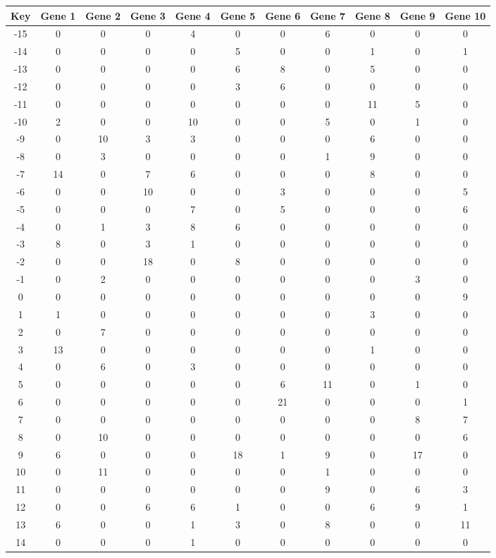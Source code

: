 \begin{tabular}{|c|c|c|c|c|c|c|c|c|c|c|}
\hline
Key & Gene 1 & Gene 2 & Gene 3 & Gene 4 & Gene 5 & Gene 6 & Gene 7 & Gene 8 & Gene 9 & Gene 10 \\
\hline
-15 & 0 & 0 & 0 & 4 & 0 & 0 & 6 & 0 & 0 & 0 \\
-14 & 0 & 0 & 0 & 0 & 5 & 0 & 0 & 1 & 0 & 1 \\
-13 & 0 & 0 & 0 & 0 & 6 & 8 & 0 & 5 & 0 & 0 \\
-12 & 0 & 0 & 0 & 0 & 3 & 6 & 0 & 0 & 0 & 0 \\
-11 & 0 & 0 & 0 & 0 & 0 & 0 & 0 & 11 & 5 & 0 \\
-10 & 2 & 0 & 0 & 10 & 0 & 0 & 5 & 0 & 1 & 0 \\
-9 & 0 & 10 & 3 & 3 & 0 & 0 & 0 & 6 & 0 & 0 \\
-8 & 0 & 3 & 0 & 0 & 0 & 0 & 1 & 9 & 0 & 0 \\
-7 & 14 & 0 & 7 & 6 & 0 & 0 & 0 & 8 & 0 & 0 \\
-6 & 0 & 0 & 10 & 0 & 0 & 3 & 0 & 0 & 0 & 5 \\
-5 & 0 & 0 & 0 & 7 & 0 & 5 & 0 & 0 & 0 & 6 \\
-4 & 0 & 1 & 3 & 8 & 6 & 0 & 0 & 0 & 0 & 0 \\
-3 & 8 & 0 & 3 & 1 & 0 & 0 & 0 & 0 & 0 & 0 \\
-2 & 0 & 0 & 18 & 0 & 8 & 0 & 0 & 0 & 0 & 0 \\
-1 & 0 & 2 & 0 & 0 & 0 & 0 & 0 & 0 & 3 & 0 \\
0 & 0 & 0 & 0 & 0 & 0 & 0 & 0 & 0 & 0 & 9 \\
1 & 1 & 0 & 0 & 0 & 0 & 0 & 0 & 3 & 0 & 0 \\
2 & 0 & 7 & 0 & 0 & 0 & 0 & 0 & 0 & 0 & 0 \\
3 & 13 & 0 & 0 & 0 & 0 & 0 & 0 & 1 & 0 & 0 \\
4 & 0 & 6 & 0 & 3 & 0 & 0 & 0 & 0 & 0 & 0 \\
5 & 0 & 0 & 0 & 0 & 0 & 6 & 11 & 0 & 1 & 0 \\
6 & 0 & 0 & 0 & 0 & 0 & 21 & 0 & 0 & 0 & 1 \\
7 & 0 & 0 & 0 & 0 & 0 & 0 & 0 & 0 & 8 & 7 \\
8 & 0 & 10 & 0 & 0 & 0 & 0 & 0 & 0 & 0 & 6 \\
9 & 6 & 0 & 0 & 0 & 18 & 1 & 9 & 0 & 17 & 0 \\
10 & 0 & 11 & 0 & 0 & 0 & 0 & 1 & 0 & 0 & 0 \\
11 & 0 & 0 & 0 & 0 & 0 & 0 & 9 & 0 & 6 & 3 \\
12 & 0 & 0 & 6 & 6 & 1 & 0 & 0 & 6 & 9 & 1 \\
13 & 6 & 0 & 0 & 1 & 3 & 0 & 8 & 0 & 0 & 11 \\
14 & 0 & 0 & 0 & 1 & 0 & 0 & 0 & 0 & 0 & 0 \\
\hline
\end{tabular}